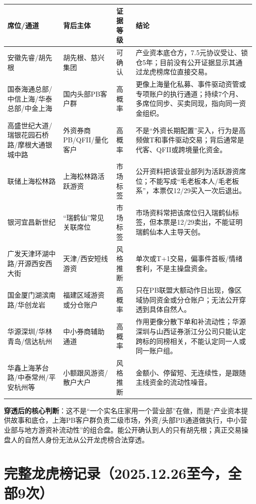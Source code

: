 \documentclass[a4paper,11pt,fontset=none]{ctexart}
\begin{document}
\begin{tabularx}{\textwidth}{L{3.3cm}L{2.2cm}L{2cm}X}
\toprule
\textbf{席位/通道} & \textbf{背后主体} & \textbf{证据等级} & \textbf{结论} \\
\midrule
安徽先睿/胡先根 & 胡先根、慈兴集团 & 可确认 & 产业资本底仓方，7.5元协议受让、锁仓5年；目前没有公开证据显示其通过龙虎榜席位直接交易。 \\
国泰海通总部/中信上海/华泰总部/中金上海 & 国内头部PB客户群 & 高概率 & 更像上海量化私募、事件驱动资管或专项账户的执行通道；持续7个月、多席位同步、买卖同现，指向同一资金组织。 \\
高盛世纪大道/瑞银花园石桥路/摩根大通银城中路 & 外资券商PB/QFII/量化客户 & 高概率 & 不是“外资长期配置”买入，行为是高频做T和事件驱动交易；背后通常是代客、QFII或跨境量化资金。 \\
联储上海松林路 & 上海松林路活跃游资 & 市场标签 & 公开资料把该营业部列为活跃游资席位；不能写成“毛老板本人/毛老板系”，本票仅12/29买入一次后退出。 \\
银河宜昌新世纪 & “瑞鹤仙”常见关联席位 & 市场标签 & 市场资料常把该席位归入瑞鹤仙标签，但本票是12/29卖出，不能证明瑞鹤仙本人主导天创。 \\
广发天津环湖中路/开源西安西大街 & 天津/西安短线游资 & 风格推断 & 单次或T+1交易，偏事件首板/情绪套利，不是主操盘资金。 \\
国金厦门湖滨南路/华创龙岩 & 福建区域游资或分仓账户 & 高概率 & 只在PB联盟大额动作日出现，像区域协同资金或分仓账户；无法公开穿透到具体自然人。 \\
华源深圳/华林青岛/信达杭州 & 中小券商辅助通道 & 高概率 & 作用更像分散下单和补流动性；华源深圳与山西证券浙江分公司只能认定跨标的同榜相关，不能认定同一人或同一账户组。 \\
华鑫上海茅台路/中泰常州/平安杭州等 & 小额跟风游资/散户大户 & 风格推断 & 金额小、停留短、无连续性，是跟随主线资金的流动性噪音。 \\
\bottomrule
\end{tabularx}

\textbf{穿透后的核心判断}：这不是“一个实名庄家用一个营业部”在做，而是“产业资本提供故事和底仓，上海PB客户群负责二级市场，外资/头部PB通道做执行，中小营业部与地方游资补流动性”的组合盘。能公开确认到人的只有胡先根；真正交易操盘人的自然人身份无法从公开龙虎榜合法穿透。

\section{完整龙虎榜记录（2025.12.26至今，全部9次）}
\end{document}
